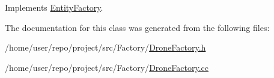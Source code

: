 Implements \hyperlink{classEntityFactory_a7f579ca02f15935e6901e5c955c9726a}{Entity\+Factory}.



The documentation for this class was generated from the following files\+:\begin{DoxyCompactItemize}
\item 
/home/user/repo/project/src/\+Factory/\hyperlink{DroneFactory_8h}{Drone\+Factory.\+h}\item 
/home/user/repo/project/src/\+Factory/\hyperlink{DroneFactory_8cc}{Drone\+Factory.\+cc}\end{DoxyCompactItemize}
